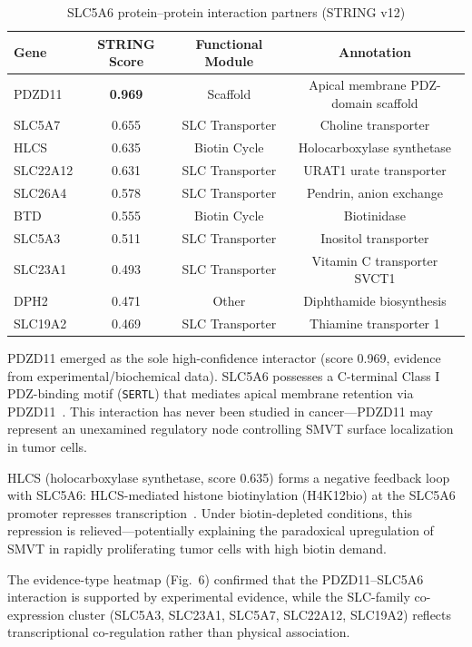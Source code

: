 \documentclass[pdflatex,sn-nature]{sn-jnl}
\begin{document}
\begin{table}[t]
\centering
\caption{SLC5A6 protein--protein interaction partners (STRING v12)}
\label{tab:string}
\begin{tabular}{lccc}
\toprule
Gene & STRING Score & Functional Module & Annotation \\
\midrule
PDZD11   & \textbf{0.969} & Scaffold        & Apical membrane PDZ-domain scaffold \\
SLC5A7   & 0.655 & SLC Transporter & Choline transporter \\
HLCS     & 0.635 & Biotin Cycle    & Holocarboxylase synthetase \\
SLC22A12 & 0.631 & SLC Transporter & URAT1 urate transporter \\
SLC26A4  & 0.578 & SLC Transporter & Pendrin, anion exchange \\
BTD      & 0.555 & Biotin Cycle    & Biotinidase \\
SLC5A3   & 0.511 & SLC Transporter & Inositol transporter \\
SLC23A1  & 0.493 & SLC Transporter & Vitamin C transporter SVCT1 \\
DPH2     & 0.471 & Other           & Diphthamide biosynthesis \\
SLC19A2  & 0.469 & SLC Transporter & Thiamine transporter 1 \\
\bottomrule
\end{tabular}
\end{table}

PDZD11 emerged as the sole high-confidence interactor (score 0.969, evidence from experimental/biochemical data). SLC5A6 possesses a C-terminal Class I PDZ-binding motif (\texttt{SERTL}) that mediates apical membrane retention via PDZD11~\cite{nabokina2011}. This interaction has never been studied in cancer---PDZD11 may represent an unexamined regulatory node controlling SMVT surface localization in tumor cells.

HLCS (holocarboxylase synthetase, score 0.635) forms a negative feedback loop with SLC5A6: HLCS-mediated histone biotinylation (H4K12bio) at the SLC5A6 promoter represses transcription~\cite{zempleni2008}. Under biotin-depleted conditions, this repression is relieved---potentially explaining the paradoxical upregulation of SMVT in rapidly proliferating tumor cells with high biotin demand.

The evidence-type heatmap (Fig.~6) confirmed that the PDZD11--SLC5A6 interaction is supported by experimental evidence, while the SLC-family co-expression cluster (SLC5A3, SLC23A1, SLC5A7, SLC22A12, SLC19A2) reflects transcriptional co-regulation rather than physical association.
\end{document}
